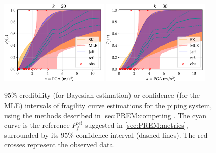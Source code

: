 \begin{figure}[h]
    \centering
    \includegraphics[width=5.2cm]{figures/PREM/asg/PGA20.pdf}\hspace*{0.5cm}
    \includegraphics[width=5.2cm]{figures/PREM/asg/PGA30.pdf}
    \caption{$95\%$ credibility (for Bayesian estimation) or confidence (for the MLE) intervals of fragility curve estimations for the piping system, using the methods described in \cref{sec:PREM:competing}. %
    The cyan curve is the reference $P^\text{ref}_f$ suggested in \cref{sec:PREM:metrics}, surrounded by its $95\%$-confidence interval (dashed lines). The red crosses represent the observed data.}
    \label{fig:ASG-curves}
\end{figure}


